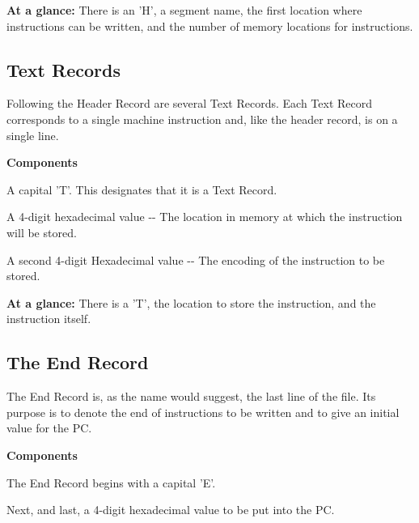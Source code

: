 \begin{DoxyParagraph}{}
{\bfseries At a glance:} There is an 'H', a segment name, the first location where instructions can be written, and the number of memory locations for instructions.
\end{DoxyParagraph}
\hypertarget{index_text}{}\subsection{Text Records}\label{index_text}
\begin{DoxyParagraph}{}
Following the Header Record are several Text Records. Each Text Record corresponds to a single machine instruction and, like the header record, is on a single line. 
\end{DoxyParagraph}
\begin{DoxyParagraph}{}
{\bfseries Components} \begin{DoxyItemize}
\item A capital 'T'. This designates that it is a Text Record. \item A 4-\/digit hexadecimal value -\/-\/ The location in memory at which the instruction will be stored. \item A second 4-\/digit Hexadecimal value -\/-\/ The encoding of the instruction to be stored. \end{DoxyItemize}

\end{DoxyParagraph}
\begin{DoxyParagraph}{}
{\bfseries At a glance:} There is a 'T', the location to store the instruction, and the instruction itself.
\end{DoxyParagraph}
\hypertarget{index_end}{}\subsection{The End Record}\label{index_end}
\begin{DoxyParagraph}{}
The End Record is, as the name would suggest, the last line of the file. Its purpose is to denote the end of instructions to be written and to give an initial value for the PC.\par
\par
 
\end{DoxyParagraph}
\begin{DoxyParagraph}{}
{\bfseries Components} \begin{DoxyItemize}
\item The End Record begins with a capital 'E'.\par
 \item Next, and last, a 4-\/digit hexadecimal value to be put into the PC. \end{DoxyItemize}

\end{DoxyParagraph}
